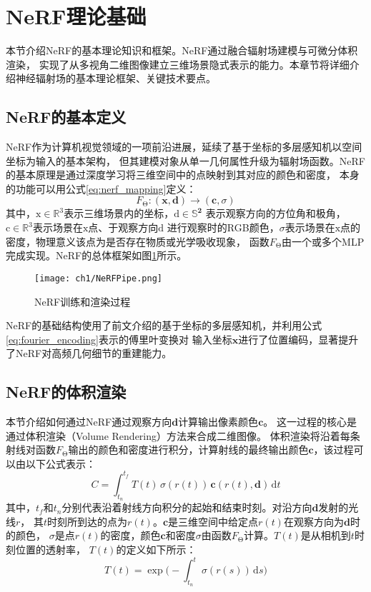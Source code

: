 \section{NeRF理论基础}
本节介绍NeRF的基本理论知识和框架。NeRF通过融合辐射场建模与可微分体积渲染，
实现了从多视角二维图像建立三维场景隐式表示的能力。本章节将详细介绍神经辐射场的基本理论框架、关键技术要点。

\subsection{NeRF的基本定义}
NeRF作为计算机视觉领域的一项前沿进展，延续了基于坐标的多层感知机以空间坐标为输入的基本架构，
但其建模对象从单一几何属性升级为辐射场函数。NeRF的基本原理是通过深度学习将三维空间中的点映射到其对应的颜色和密度，
本身的功能可以用公式\eqref{eq:nerf_mapping}定义：
\begin{equation}
  F_{\upTheta}:({\boldsymbol{x}}, {\boldsymbol{d}})\rightarrow({\boldsymbol{c}},\sigma)
  \label{eq:nerf_mapping}
\end{equation}
其中，$\mathrm{x}\in\mathbb{R}^3$表示三维场景内的坐标，$\mathrm{d}\in\mathbb{S}^\boldsymbol{2}$
表示观察方向的方位角和极角，$\mathrm{c}\in\mathbb{R}^3$表示场景在$\mathrm{x}$点、于观察方向$\mathrm{d}$
进行观察时的RGB颜色，$\sigma$表示场景在$\mathrm{x}$点的密度，物理意义该点为是否存在物质或光学吸收现象，
函数$F_{\upTheta}$由一个或多个MLP完成实现。NeRF的总体框架如图\ref{fig:nerf_pipe}所示。
\begin{figure}[htbp]
  \centering
  \texttt{[image: ch1/NeRFPipe.png]}
  \caption{NeRF训练和渲染过程\cite{Mildenhall_2020}}
  \label{fig:nerf_pipe}
\end{figure}

NeRF的基础结构使用了前文介绍的基于坐标的多层感知机，并利用公式\eqref{eq:fourier_encoding}表示的傅里叶变换对
输入坐标$\boldsymbol x$进行了位置编码，显著提升了NeRF对高频几何细节的重建能力。

\subsection{NeRF的体积渲染}

本节介绍如何通过NeRF通过观察方向$\boldsymbol d$计算输出像素颜色$\boldsymbol c$。
这一过程的核心是通过体积渲染（Volume Rendering）方法来合成二维图像。
体积渲染将沿着每条射线对函数$F_{\upTheta}$输出的颜色和密度进行积分，计算射线的最终输出颜色$\boldsymbol c$，该过程可以由以下公式表示：
\begin{equation}\label{eq:volume_rendering}
C=\int_{t_n}^{t_f}T(t)\,\sigma(r(t))\,{\boldsymbol c}(r(t),{\boldsymbol d})\,\mathrm{d}t
\end{equation}
其中，$t_f$和$t_n$分别代表沿着射线方向积分的起始和结束时刻。对沿方向$\boldsymbol{d}$发射的光线$r$，
其$t$时刻所到达的点为$r(t)$。$\boldsymbol{c}$是三维空间中给定点$r(t)$在观察方向为$\boldsymbol{d}$时的颜色，
$\sigma$是点$r(t)$的密度，颜色$\boldsymbol c$和密度$\sigma$由函数$F_{\upTheta}$计算。$T(t)$是从相机到$t$时刻位置的透射率，
$T(t)$的定义如下所示：
\begin{equation}\label{eq:transmittance}
T(t)=\exp\Biggl(-\int_{t_n}^{t}\sigma(r(s))\,\mathrm{d}s\Biggr)
\end{equation}


